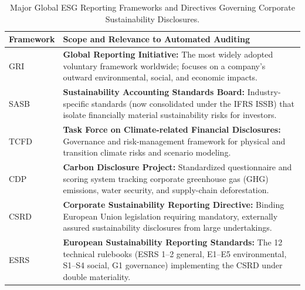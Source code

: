 \begin{table}[H]
\centering
\caption{Major Global ESG Reporting Frameworks and Directives Governing Corporate Sustainability Disclosures.}
\label{tab:frameworks}
\small
\begin{tabularx}{\linewidth}{lX}
\toprule
\textbf{Framework} & \textbf{Scope and Relevance to Automated Auditing} \\
\midrule
GRI~\citep{gri2021} & \textbf{Global Reporting Initiative:} The most widely adopted voluntary framework worldwide; focuses on a company's outward environmental, social, and economic impacts. \\
\addlinespace[3pt]
SASB~\citep{sasb2017} & \textbf{Sustainability Accounting Standards Board:} Industry-specific standards (now consolidated under the IFRS ISSB) that isolate financially material sustainability risks for investors. \\
\addlinespace[3pt]
TCFD~\citep{tcfd2017} & \textbf{Task Force on Climate-related Financial Disclosures:} Governance and risk-management framework for physical and transition climate risks and scenario modeling. \\
\addlinespace[3pt]
CDP~\citep{cdp2025} & \textbf{Carbon Disclosure Project:} Standardized questionnaire and scoring system tracking corporate greenhouse gas (GHG) emissions, water security, and supply-chain deforestation. \\
\addlinespace[3pt]
CSRD~\citep{csrd2022} & \textbf{Corporate Sustainability Reporting Directive:} Binding European Union legislation requiring mandatory, externally assured sustainability disclosures from large undertakings. \\
\addlinespace[3pt]
ESRS~\citep{esrs2023} & \textbf{European Sustainability Reporting Standards:} The 12 technical rulebooks (ESRS 1--2 general, E1--E5 environmental, S1--S4 social, G1 governance) implementing the CSRD under double materiality. \\
\bottomrule
\end{tabularx}
\end{table}
